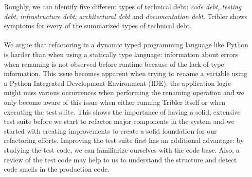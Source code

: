 Roughly, we can identify five different types of technical debt\cite{seaman2011measuring}: \emph{code debt}, \emph{testing debt}, \emph{infrastructure debt}, \emph{architectural debt} and \emph{documentation debt}. Tribler shows symptoms for every of the summarized types of technical debt.\\\\
We argue that refactoring in a dynamic typed programming language like Python is harder than when using a statically type language: information about errors when renaming is not observed before runtime because of the lack of type information. This issue becomes apparent when trying to rename a variable using a Python Integrated Development Environment (IDE): the application logic might miss various occurrences when performing the renaming operation and we only become aware of this issue when either running Tribler itself or when executing the test suite. This shows the importance of having a solid, extensive test suite before we start to refactor major components in the system and we started with creating improvements to create a solid foundation for our refactoring efforts. Improving the test suite first has an additional advantage: by studying the test code, we can familiarize ourselves with the code base. Also, a review of the test code may help to us to understand the structure and detect code smells in the production code\cite{van2002video}.\\\\

